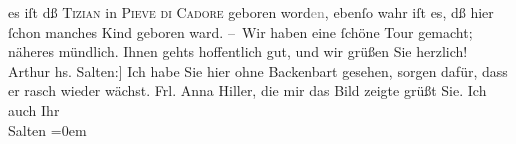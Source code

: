 \begin{ledgroupsized}[t]{13cm}
               es iſt dß \textsc{Tizian} in \textsc{Pieve di Cadore} geboren word\textcolor{gray}{en}, ebenſo wahr iſt es, dß hier ſchon manches
               Kind geboren ward.\pend
           \pstart
           – Wir haben eine ſchöne Tour gemacht; näheres mündlich. Ihnen gehts hoffentlich gut,
               und wir grüßen Sie herzlich!\pend
           \pstart \spacefill\mbox{Arthur}\pend{}\pstart
           \noindent{}{[}hs. Salten:{]} Ich habe Sie hier ohne Backenbart gesehen, sorgen
               dafür, dass er rasch wieder wächst. Frl. Anna
                  Hiller, die mir das Bild zeigte grüßt Sie. Ich auch\pend
           \pstart
           Ihr{\\[\baselineskip]}\spacefill\mbox{Salten}\pend
           \leftskip=0em{}
         
         \endnumbering{}\end{ledgroupsized}  \newcommand{\dateiname}{L00260}\newcommand{\titel}{Arthur Schnitzler und Felix Salten an Richard Beer-Hofmann, 27. 8. 1893}\newcommand{\editorInnen}{Martin Anton Müller und Gerd-Hermann Susen}
      
